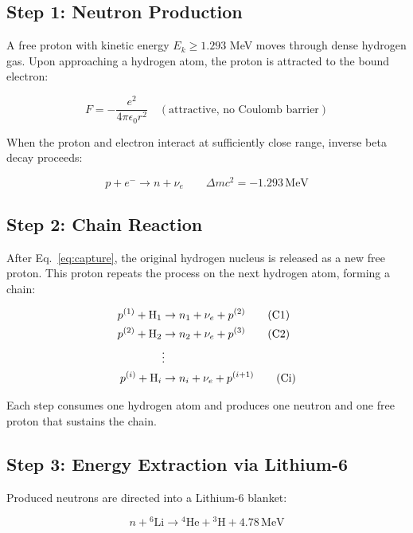 \documentclass[12pt,a4paper]{article}
\begin{document}
\subsection{Step 1: Neutron Production}

A free proton with kinetic energy $E_k \geq 1.293$ MeV moves through
dense hydrogen gas. Upon approaching a hydrogen atom, the proton is
attracted to the bound electron:

\begin{equation}
  F = -\frac{e^2}{4\pi\epsilon_0 r^2} \quad (\text{attractive, no Coulomb barrier})
\end{equation}

When the proton and electron interact at sufficiently close range,
inverse beta decay proceeds:

\begin{equation}
  p + e^- \rightarrow n + \nu_e \qquad \Delta mc^2 = -1.293\,\text{MeV}
  \label{eq:capture}
\end{equation}

\subsection{Step 2: Chain Reaction}

After Eq.~\eqref{eq:capture}, the original hydrogen nucleus is
released as a new free proton. This proton repeats the process on the
next hydrogen atom, forming a chain:

\begin{align}
  p^{(1)} + \text{H}_1 &\rightarrow n_1 + \nu_e + p^{(2)} \tag{C1} \\
  p^{(2)} + \text{H}_2 &\rightarrow n_2 + \nu_e + p^{(3)} \tag{C2} \\
  &\vdots \notag \\
  p^{(i)} + \text{H}_i &\rightarrow n_i + \nu_e + p^{(i+1)} \tag{Ci}
\end{align}

Each step consumes one hydrogen atom and produces one neutron and
one free proton that sustains the chain.

\subsection{Step 3: Energy Extraction via Lithium-6}

Produced neutrons are directed into a Lithium-6 blanket:

\begin{equation}
  n + {}^6\text{Li} \rightarrow {}^4\text{He} + {}^3\text{H}
  + 4.78\,\text{MeV}
  \label{eq:licapture}
\end{equation}
\end{document}
